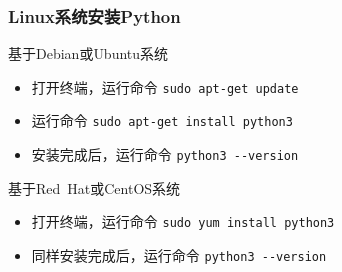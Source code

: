\begin{frame}[fragile]
	\frametitle{\textrm{Linux}系统安装\textrm{Python}}
	    基于\textrm{Debian}或\textrm{Ubuntu}系统
            \begin{itemize}
		    \item 打开终端，运行命令 \verb|sudo apt-get update|\\
			    {\fontsize{7.2pt}{4.2pt}\selectfont{\textcolor{magenta}{\%更新软件源}}}
               \item 运行命令 \verb|sudo apt-get install python3|\\
		       {\fontsize{7.2pt}{4.2pt}}
                \item 安装完成后，运行命令 \verb|python3 --version|\\
			{\fontsize{7.2pt}{4.2pt}}
            \end{itemize}
	    基于\textrm{Red~Hat}或\textrm{CentOS}系统
            \begin{itemize}
                \item 打开终端，运行命令 \verb|sudo yum install python3|\\
			{\fontsize{7.2pt}{4.2pt}}
                \item 同样安装完成后，运行命令 \verb|python3 --version|\\
			{\fontsize{7.2pt}{4.2pt}}
            \end{itemize}
\end{frame}

